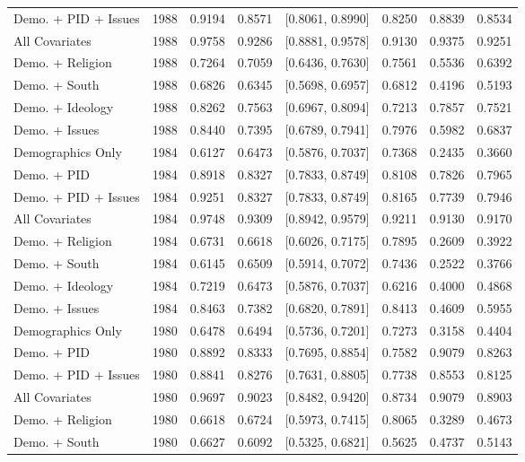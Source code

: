 \begin{longtable}{lrrrlrrr}
  Demo. + PID + Issues & 1988 & 0.9194 & 0.8571 & [0.8061, 0.8990] & 0.8250 & 0.8839 & 0.8534 \\ 
  All Covariates & 1988 & 0.9758 & 0.9286 & [0.8881, 0.9578] & 0.9130 & 0.9375 & 0.9251 \\ 
  Demo. + Religion & 1988 & 0.7264 & 0.7059 & [0.6436, 0.7630] & 0.7561 & 0.5536 & 0.6392 \\ 
  Demo. + South & 1988 & 0.6826 & 0.6345 & [0.5698, 0.6957] & 0.6812 & 0.4196 & 0.5193 \\ 
  Demo. + Ideology & 1988 & 0.8262 & 0.7563 & [0.6967, 0.8094] & 0.7213 & 0.7857 & 0.7521 \\ 
  Demo. + Issues & 1988 & 0.8440 & 0.7395 & [0.6789, 0.7941] & 0.7976 & 0.5982 & 0.6837 \\ 
  Demographics Only & 1984 & 0.6127 & 0.6473 & [0.5876, 0.7037] & 0.7368 & 0.2435 & 0.3660 \\ 
  Demo. + PID & 1984 & 0.8918 & 0.8327 & [0.7833, 0.8749] & 0.8108 & 0.7826 & 0.7965 \\ 
  Demo. + PID + Issues & 1984 & 0.9251 & 0.8327 & [0.7833, 0.8749] & 0.8165 & 0.7739 & 0.7946 \\ 
  All Covariates & 1984 & 0.9748 & 0.9309 & [0.8942, 0.9579] & 0.9211 & 0.9130 & 0.9170 \\ 
  Demo. + Religion & 1984 & 0.6731 & 0.6618 & [0.6026, 0.7175] & 0.7895 & 0.2609 & 0.3922 \\ 
  Demo. + South & 1984 & 0.6145 & 0.6509 & [0.5914, 0.7072] & 0.7436 & 0.2522 & 0.3766 \\ 
  Demo. + Ideology & 1984 & 0.7219 & 0.6473 & [0.5876, 0.7037] & 0.6216 & 0.4000 & 0.4868 \\ 
  Demo. + Issues & 1984 & 0.8463 & 0.7382 & [0.6820, 0.7891] & 0.8413 & 0.4609 & 0.5955 \\ 
  Demographics Only & 1980 & 0.6478 & 0.6494 & [0.5736, 0.7201] & 0.7273 & 0.3158 & 0.4404 \\ 
  Demo. + PID & 1980 & 0.8892 & 0.8333 & [0.7695, 0.8854] & 0.7582 & 0.9079 & 0.8263 \\ 
  Demo. + PID + Issues & 1980 & 0.8841 & 0.8276 & [0.7631, 0.8805] & 0.7738 & 0.8553 & 0.8125 \\ 
  All Covariates & 1980 & 0.9697 & 0.9023 & [0.8482, 0.9420] & 0.8734 & 0.9079 & 0.8903 \\ 
  Demo. + Religion & 1980 & 0.6618 & 0.6724 & [0.5973, 0.7415] & 0.8065 & 0.3289 & 0.4673 \\ 
  Demo. + South & 1980 & 0.6627 & 0.6092 & [0.5325, 0.6821] & 0.5625 & 0.4737 & 0.5143 \\ 

\end{longtable}
